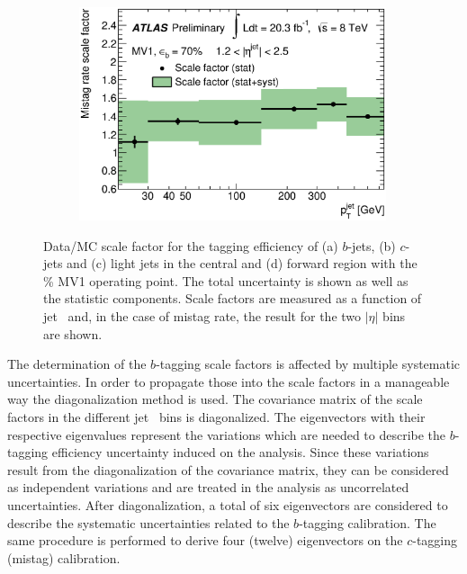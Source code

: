 \begin{figure}[tb!]
\begin{subfigure}[t]{0.45\textwidth}
   \caption{}
\end{subfigure}
\begin{subfigure}[t]{0.45\textwidth}
  \includegraphics[width=0.99\textwidth]{Objects/Figures/fig_08d_L_EB_SF.eps}
   \caption{}
\end{subfigure}
\caption{ Data/MC scale factor for the tagging efficiency of (a) $b$-jets, (b) $c$-jets and (c) light jets in the central and (d) forward region with the \unit[70]{\%} MV1 operating point. The total uncertainty is shown as well as the statistic components.
Scale factors are measured as a function of jet \pT\ and, in the case of mistag rate, the result for the two $|\eta|$ bins are shown.}
\label{fig:OBbtagsf}
\end{figure} 


The determination of the $b$-tagging scale factors is affected by multiple systematic uncertainties. In order to propagate those into the scale factors in a manageable way the diagonalization method is used.
The covariance matrix of the scale factors in the different jet \pt\ bins is diagonalized. The eigenvectors with their respective eigenvalues represent the variations which are needed to describe the $b$-tagging efficiency uncertainty induced on the analysis.
Since these variations result from the diagonalization of the covariance
matrix, they can be considered as independent variations and are treated in the
analysis as uncorrelated uncertainties.
After diagonalization, a total of six eigenvectors are considered to describe the systematic uncertainties related to the $b$-tagging calibration. The same procedure is performed to derive four (twelve) eigenvectors on the $c$-tagging (mistag) calibration.

